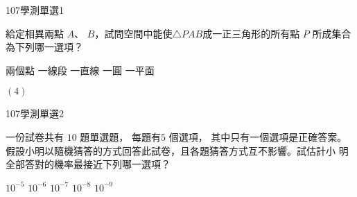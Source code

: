 \begin{QUESTIONS}
    \begin{QUESTION}
        \begin{ExamInfo}{107}{學測}{單選}{1}
        \end{ExamInfo}
        \begin{ExamAnsRateInfo}{}{}{}{}
        \end{ExamAnsRateInfo}
        \begin{QBODY}
            給定相異兩點 $A$、 $B$，試問空間中能使$\triangle PAB$成一正三角形的所有點 $P$ 所成集合
            為下列哪一選項？
            \begin{QOPS}
                \QOP 兩個點
                \QOP 一線段
                \QOP 一直線
                \QOP 一圓
                \QOP 一平面
            \end{QOPS}
        \end{QBODY}
        \begin{QFROMS}
        \end{QFROMS}
        \begin{QTAGS}\end{QTAGS}
        \begin{QANS}
            $(4)$
        \end{QANS}
        \begin{QSOLLIST}
        \end{QSOLLIST}
        \begin{QEMPTYSPACE}
        \end{QEMPTYSPACE}
    \end{QUESTION}
    \begin{QUESTION}
        \begin{ExamInfo}{107}{學測}{單選}{2}
        \end{ExamInfo}
        \begin{ExamAnsRateInfo}{}{}{}{}
        \end{ExamAnsRateInfo}
        \begin{QBODY}
            一份試卷共有 $10$ 題單選題， 每題有$5$ 個選項， 其中只有一個選項是正確答案。
            假設小明以隨機猜答的方式回答此試卷，且各題猜答方式互不影響。試估計小
            明全部答對的機率最接近下列哪一選項？
            \begin{QOPS}
                \QOP $10^{-5}$
                \QOP $10^{-6}$
                \QOP $10^{-7}$
                \QOP $10^{-8}$
                \QOP $10^{-9}$
            \end{QOPS}

\end{QBODY}
\end{QUESTION}
\end{QUESTIONS}
